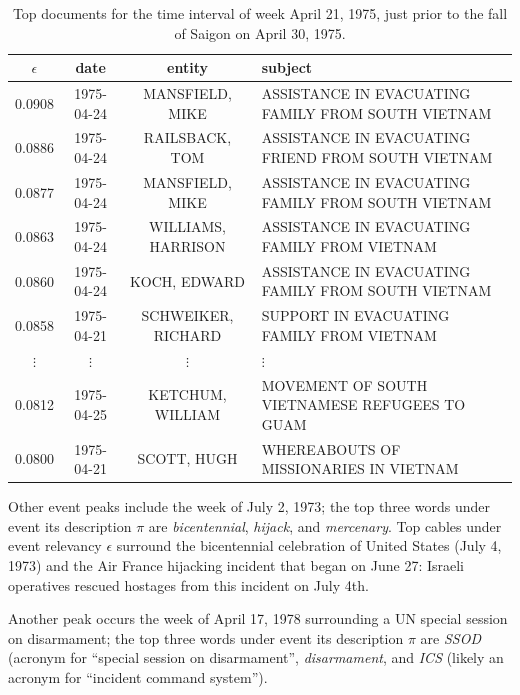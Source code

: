 \begin{table}[htb]
\small
\centering
\begin{tabular}{cccl}
\toprule
$\epsilon$ & date & entity & subject \\
\midrule
0.0908 & 1975-04-24 & {\footnotesize MANSFIELD, MIKE} & {\footnotesize ASSISTANCE IN EVACUATING FAMILY FROM SOUTH VIETNAM } \\
0.0886   &  1975-04-24 & {\footnotesize RAILSBACK, TOM } & {\footnotesize    ASSISTANCE IN EVACUATING FRIEND FROM SOUTH VIETNAM }\\
0.0877   &  1975-04-24  &  {\footnotesize MANSFIELD, MIKE  }  & {\footnotesize    ASSISTANCE IN EVACUATING FAMILY FROM SOUTH VIETNAM}\\
0.0863   &  1975-04-24  &  {\footnotesize WILLIAMS, HARRISON   }  &  {\footnotesize    ASSISTANCE IN EVACUATING FAMILY FROM VIETNAM}\\
0.0860   &  1975-04-24  &  {\footnotesize KOCH, EDWARD } & {\footnotesize ASSISTANCE IN EVACUATING FAMILY FROM SOUTH VIETNAM }\\
0.0858   &  1975-04-21  &  {\footnotesize SCHWEIKER, RICHARD } & {\footnotesize  SUPPORT IN EVACUATING FAMILY FROM VIETNAM } \\
$\vdots$ & $\vdots$ & $\vdots$ & $\vdots$ \\
0.0812  &   1975-04-25  &  {\footnotesize KETCHUM, WILLIAM} & {\footnotesize  MOVEMENT OF SOUTH VIETNAMESE REFUGEES TO GUAM } \\
0.0800 & 1975-04-21 & {\footnotesize SCOTT, HUGH } & {\footnotesize  WHEREABOUTS OF MISSIONARIES IN VIETNAM }\\
\bottomrule
\end{tabular}
\label{tab:saigon}
\caption{Top documents for the time interval of week April 21, 1975, just prior to the fall of Saigon on April 30, 1975.}
\end{table}

Other event peaks include the week of July 2, 1973; the top three words under event its description $\pi$ are \emph{bicentennial}, \emph{hijack}, and \emph{mercenary}.  Top cables under event relevancy $\epsilon$ surround the bicentennial celebration of United States (July 4, 1973) and the Air France hijacking incident that began on June 27: Israeli operatives rescued hostages from this incident on July 4th.

Another peak occurs the week of April 17, 1978 surrounding a UN special session on disarmament; the top three words under event its description $\pi$ are \emph{SSOD} (acronym for ``special session on disarmament'', \emph{disarmament}, and \emph{ICS} (likely an acronym for ``incident command system'').

